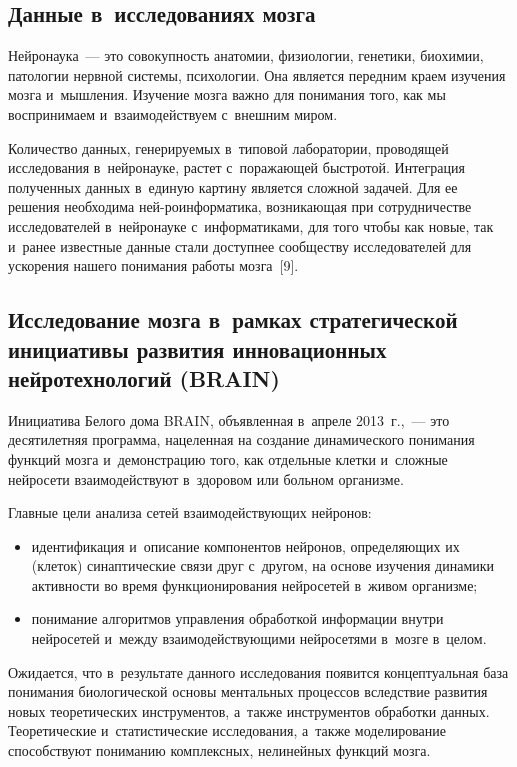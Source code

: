 \begin{multicols}{2}
\section{Данные в~исследованиях мозга}

  Нейронаука~--- это совокупность анатомии, физиологии, генетики, биохимии, 
патологии нервной системы, психологии. Она является передним краем изучения мозга 
и~мышления. Изучение мозга важно для понимания того, как мы воспринимаем 
и~взаимодействуем с~внешним миром. 
  
  Количество данных, генерируемых в~типовой лаборатории, проводящей исследования 
в~нейронауке, растет с~поражающей быстротой. Интеграция полученных данных в~единую 
картину является сложной задачей. Для ее решения необходима
 ней-\linebreak роинформатика, 
возникающая при сотрудничестве исследователей в~нейронауке с~информатиками, для 
того чтобы как новые, так и~ранее известные данные стали доступнее сообществу 
исследователей для ускорения нашего понимания работы мозга~[9].

\subsection{Исследование мозга в~рамках стратегической инициативы развития 
инновационных нейротехнологий (BRAIN)}
  
  Инициатива Белого дома BRAIN, объявленная в~апреле 2013~г.,~--- это десятилетняя 
программа, нацеленная на создание динамического понимания функций мозга 
и~демонстрацию того, как отдельные клетки и~сложные нейросети взаимодействуют 
в~здоровом или больном организме. 
  
  Главные цели анализа сетей взаимодейст\-ву\-ющих нейронов:
  \begin{itemize}
\item идентификация и~описание компонентов нейронов, определяющих их (клеток) 
синаптические связи друг с~другом, на основе изучения динамики активности во 
время функционирования нейросетей в~живом организме;
\item понимание алгоритмов управления обработкой информации внутри 
нейросетей и~между взаимодействующими нейросетями в~мозге в~целом.
\end{itemize}

  Ожидается, что в~результате данного исследования появится концептуальная база 
понимания биологической основы ментальных процессов вследствие развития новых 
теоретических инструментов, а~также инструментов обработки данных. Теоретические 
и~статистические исследования, а~также моделирование способствуют пониманию 
комплексных, нелинейных функций мозга. 
  

\end{multicols}
